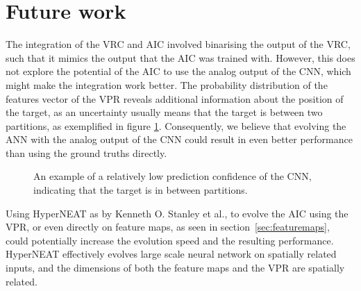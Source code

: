 \section{Future work}
\label{sec:futurework}
The integration of the VRC and AIC involved binarising the output of the VRC, such that it mimics the output that the AIC was trained with. However, this does not explore the potential of the AIC to use the analog output of the CNN, which might make the integration work better. The probability distribution of the features vector of the VPR reveals additional information about the position of the target, as an uncertainty usually means that the target is between two partitions, as exemplified in figure \ref{fig:uncertain}. Consequently, we believe that evolving the ANN with the analog output of the CNN could result in even better performance than using the ground truths directly.

\begin{figure}[H]
	\centering
	\begin{scriptsize}
		\sffamily
		
	\end{scriptsize}
	\caption[An example of uncertain classification]{An example of a relatively low prediction confidence of the CNN, indicating that the target is in between partitions.}
	\label{fig:uncertain}
\end{figure}
\noindent
Using HyperNEAT as by Kenneth O. Stanley et al.\cite{DBLP:journals/alife/StanleyDG09}, to evolve the AIC using the VPR, or even directly on feature maps, as seen in section~\ref{sec:featuremaps}, could potentially increase the evolution speed and the resulting performance. HyperNEAT effectively evolves large scale neural network on spatially related inputs, and the dimensions of both the feature maps and the VPR are spatially related.